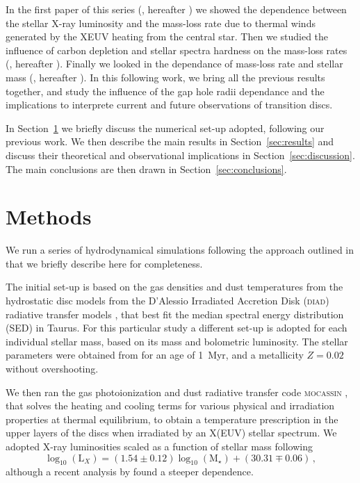 \documentclass[usenatbib,useAMS,usedcolumn]{mnras}
\begin{document}
In the first paper of this series (, hereafter ) we showed the dependence between the stellar X-ray luminosity and the mass-loss rate due to thermal winds generated by the XEUV heating from the central star. Then we studied the influence of carbon depletion  and stellar spectra hardness on the mass-loss rates (, hereafter ). Finally we looked in the dependance of mass-loss rate and stellar mass (, hereafter ). In this following work, we bring all the previous results together, and study the influence of the gap hole radii dependance and the implications to interprete current and future observations of transition discs.

In Section~\ref{sec:methods} we briefly discuss the numerical set-up adopted, following our previous work. We then describe the main results in Section~\ref{sec:results} and discuss their theoretical and observational implications in Section~\ref{sec:discussion}. The main conclusions are then drawn in Section~\ref{sec:conclusions}.

\section{Methods}\label{sec:methods}
We run a series of hydrodynamical simulations following the approach outlined in  that we briefly describe here for completeness.

The initial set-up is based on the gas densities and dust temperatures from the hydrostatic disc models from the D’Alessio Irradiated Accretion Disk (\textsc{diad}) radiative transfer models , that best fit the median spectral energy distribution (SED) in Taurus. 
For this particular study a different set-up is adopted for each individual stellar mass, based on its mass and bolometric luminosity.
The stellar parameters were obtained from  for an age of \SI{1}{Myr}, and a metallicity $Z=0.02$ without overshooting.

We then ran the gas photoionization and dust radiative transfer code \textsc{mocassin} , that solves the heating and cooling terms for various physical and irradiation properties at thermal equilibrium, to obtain a temperature prescription in the upper layers of the discs when irradiated by an X(EUV) stellar spectrum.
We adopted X-ray luminosities scaled as a function of stellar mass following 
\begin{equation}\label{eq:Lx}
	\log_{10}{(\mathrm{L}_X)} = (1.54 \pm 0.12) \log_{10}{(\mathrm{M}_\star)} + (30.31 \mp 0.06)\,,
\end{equation}
although a recent analysis by  found a steeper dependence.
\end{document}
